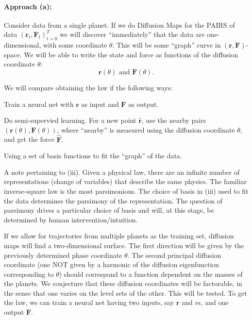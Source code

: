 \documentclass[11pt]{article}
\newcommand{\mbf}{\mathbf} 			%
\theoremstyle{plain}
\theoremstyle{remark}
\theoremstyle{definition}
\begin{document}
\paragraph{Approach (a):} Consider data from a single planet. If we do Diffusion Maps for the PAIRS of data $(\mbf r_t, \mbf F_t)_{t=0}^{T}$ we will discover ``immediately'' that the data are one-dimensional, with some coordinate $\theta$. This will be some ``graph'' curve in $(\mbf r, \mbf F)$-space. We will be able to write the state and force as functions of the diffusion coordinate $\theta$:
	\begin{equation}
	\mbf r(\theta) \text{ and } \mbf F(\theta).
	\end{equation}

We will compare obtaining the law if the following ways:
\begin{compactenum}[1.]
\item Train a neural net with $\mbf r$ as input and $\mbf F$ as output.
\item Do semi-supervied learning. For a new point $\hat{\mbf r}$, use the nearby pairs $(\mbf r(\theta),\mbf F(\theta))$, where ``nearby'' is measured using the diffusion coordinate $\theta$, and get the force $\hat{\mbf F}$.
\item Using a set of basis functions to fit the ``graph'' of the data.
\end{compactenum}

A note pertaining to (iii). Given a physical law, there are an infinite number of representations (change of variables) that describe the same physics. The familiar inverse-square law is the most parsimonious. The choice of basis in (iii) used to fit the data determines the parsimony of the representation. The question of parsimony drives a particular choice of basis and will, at this stage, be determined by human intervention/intuition.

If we allow for trajectories from multiple planets as the training set, diffusion maps will find a two-dimensional surface. The first direction will be given by the previously determined phase coordinate $\theta$. The second principal diffusion coordinate (one NOT given by a harmonic of the diffusion eigenfunction corresponding to $\theta$) should correspond to a function dependent on the masses of the planets. We conjecture that these diffusion coordinates will be factorable, in the sense that one varies on the level sets of the other. This will be tested. To get the law, we can train a neural net having two inputs, say $\mbf r$ and $m$, and one output $\mbf F$.
\end{document}
